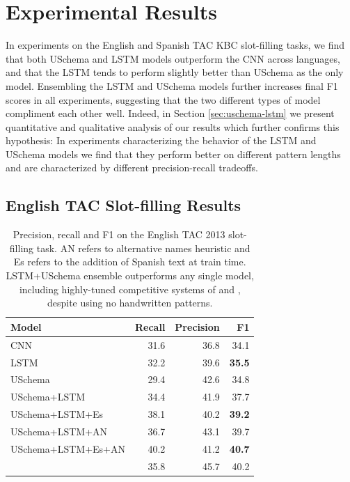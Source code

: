 \section{Experimental Results\label{sec:results}}

In experiments on the English and Spanish TAC KBC slot-filling tasks, we find that both USchema and LSTM models outperform the CNN across languages, and that the LSTM tends to perform slightly better than USchema as the only model. Ensembling the LSTM and USchema models further increases final F1 scores in all experiments, suggesting that the two different types of model compliment each other well. Indeed, in Section \ref{sec:uschema-lstm} we present quantitative and qualitative analysis of our results which further confirms this hypothesis: In experiments characterizing the behavior of the LSTM and USchema models we find that they perform better on different pattern lengths and are characterized by different precision-recall tradeoffs.

\subsection {English TAC Slot-filling Results}


\begin{table}[t!]
\setlength{\tabcolsep}{4.1pt}
\begin{center}
\begin{tabular}{|lrrr|}
\hline
\bf Model & \bf Recall & \bf Precision & \bf F1 \\
\hline\hline
CNN                 & 31.6 & 36.8 & 34.1 \\
LSTM                & 32.2 & 39.6 & \bf 35.5  \\
USchema             & 29.4 & 42.6 & 34.8 \\
\hline\hline
USchema+LSTM        & 34.4 & 41.9 & 37.7 \\
USchema+LSTM+Es        & 38.1 & 40.2 & \bf 39.2 \\
\hline\hline
USchema+LSTM+AN	& 36.7 & 43.1 & 39.7 \\
USchema+LSTM+Es+AN & 40.2 & 41.2 & \bf 40.7 \\
\citet{roth2014relationfactory} & 35.8 & 45.7 & 40.2 \\

\hline
\end{tabular}
\caption{Precision, recall and F1 on the English TAC 2013 slot-filling task. AN refers to alternative names heuristic and Es refers to the addition of Spanish text at train time. LSTM+USchema ensemble outperforms any single model, including highly-tuned competitive systems of \protect\citet{roth2014relationfactory} and \protect\citet{angeli2014stanford}, despite using no handwritten patterns.  %
\label{en-tac-table}}
\end{center}
\end{table}


